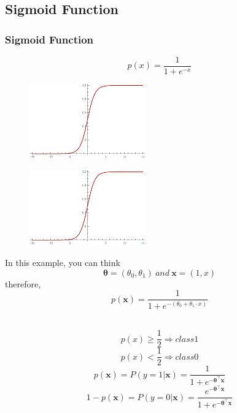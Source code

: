 \documentclass{beamer}
\begin{document}
\subsection{Sigmoid Function}
\begin{frame}
\frametitle{Sigmoid Function}
\[p(x)=\frac{1}{1+e^{-x}}\]
\begin{figure}[t]
\includegraphics[width=5cm]{graphics/1d-sigmoid}
\centering
\end{figure}
\end{frame}
\begin{frame}
\begin{multicols}{2} %
\begin{figure}[t]
\includegraphics[width=5cm]{graphics/1d-sigmoid}
\centering
\end{figure}
\columnbreak  %
In this example, you can think 
\[ \bm{\theta} = (\theta_{0}, \theta_{1}) \ and \ \mathbf{x} = (1, x)\]
therefore, 
\[p(\mathbf{x}) =  \frac{1}{1+e^{- ( \theta_{0} +  \theta_{1} \cdot  x )}} \]
\\
\end{multicols}

\begin{multicols}{2}
\[p(x) \geq \frac{1}{2}  \Rightarrow class 1\]
\[p(x)<\frac{1}{2}  \Rightarrow class 0\]
\columnbreak 
\[p(\mathbf{x})=P(y=1|\mathbf{x}) = \frac{1}{1+e^{-\bm{\theta} ^ {\intercal} \mathbf{x}}}\]
\[1-p(\mathbf{x})=P(y=0|\mathbf{x}) = \frac{e^{-\bm{\theta} ^ {\intercal} \mathbf{x}}} {1+e^{-\bm{\theta}^\intercal \mathbf{x}}} \]
\end{multicols}

\end{frame}
\end{document}
